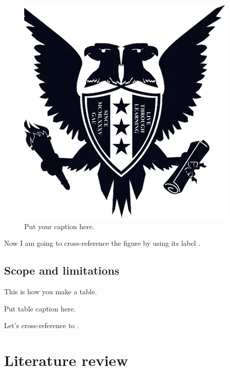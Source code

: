 \documentclass{template}
\begin{document}
\begin{figure}
\centering
\includegraphics[scale=0.2]{logo}
\caption{Put your caption here.}
\label{fig:logo}
\end{figure}

Now I am going to cross-reference the figure by using its label .

\section{Scope and limitations}

This is how you make a table.

\begin{table}[H]
\centering
\caption{Put table caption here.}
\label{tab:city}
\end{table}

Let's cross-reference to .

\chapter{Literature review}\label{ch:lr}
\end{document}
